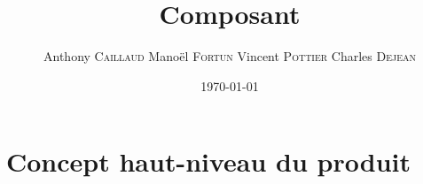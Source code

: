 \documentclass[11pt,a4paper]{article}
\title{Composant}
\author{Anthony \textsc{Caillaud} Manoël \textsc{Fortun} Vincent
\textsc{Pottier} Charles \textsc{Dejean}}
\date{\today}
\begin{document}
\maketitle

\clearpage
\tableofcontents
\clearpage
\section{Concept haut-niveau du produit}



\clearpage
  
\end{document}
